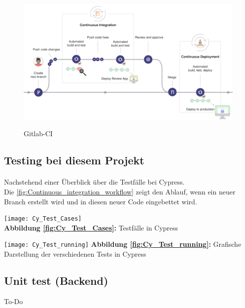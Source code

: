 \begin{figure}[ht]
	\centering
    \includegraphics[width=\textwidth]{sources/Gitlab-CI.png}\cite{MG10}
	\caption{Gitlab-CI}
	\label{fig:Continuous_integration_workflow } {\cite{GLAB1}}
\end{figure}


\subsection{Testing bei diesem Projekt}
\paragraph{}
Nachstehend einer Überblick über die Testfälle bei Cypress.
\\
Die \autoref{fig:Continuous_integration_workflow} zeigt den Ablauf, wenn ein neuer Branch erstellt wird und in diesen neuer Code eingebettet wird.
\begin{center}
\texttt{[image: Cy\_Test\_Cases]}
\label{fig:Cy_Test_Cases}\\
\textbf{Abbildung \autoref{fig:Cy_Test_Cases}:} Testfälle in Cypress
\end{center}

\begin{center}
\texttt{[image: Cy\_Test\_running]}\label{fig:Cy_Test_running}
\textbf{Abbildung \autoref{fig:Cy_Test_running}:} Grafische Darstellung der verschiedenen Tests in Cypress
\end{center}



\subsection{Unit test (Backend)}
To-Do

